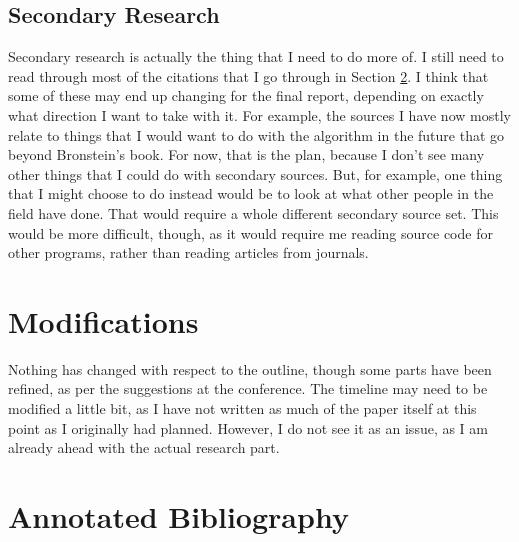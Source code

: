 \documentclass[12pt]{article}
\begin{document}
\subsection{Secondary Research}
Secondary research is actually the thing that I need to do more of. I
still need to read through most of the citations that I go through in
Section \ref{annotated-bib}.  I think that some of these may end up
changing for the final report, depending on exactly what direction I
want to take with it.  For example, the sources I have now mostly relate
to things that I would want to do with the algorithm in the future that
go beyond Bronstein's book.  For now, that is the plan, because I don't
see many other things that I could do with secondary sources.  But, for
example, one thing that I might choose to do instead would be to look at
what other people in the field have done.  That would require a whole
different secondary source set.  This would be more difficult, though,
as it would require me reading source code for other programs, rather
than reading articles from journals.

\section{Modifications}
Nothing has changed with respect to the outline, though some parts have
been refined, as per the suggestions at the conference.  The timeline
may need to be modified a little bit, as I have not written as much of
the paper itself at this point as I originally had planned.  However, I
do not see it as an issue, as I am already ahead with the actual
research part.

\section{Annotated Bibliography}
\label{annotated-bib}

\nocite{*}


\end{document}
